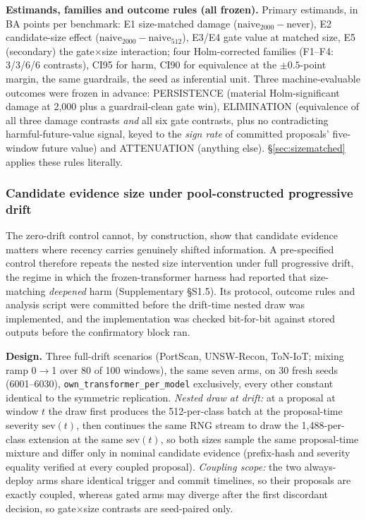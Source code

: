 \documentclass[a4paper,fleqn]{cas-sc}
\begin{document}
\textbf{Estimands, families and outcome rules (all frozen).} Primary estimands, in BA points per benchmark: E1 size-matched damage ($\mathrm{naive}_{2000}-\mathrm{never}$), E2 candidate-size effect ($\mathrm{naive}_{2000}-\mathrm{naive}_{512}$), E3/E4 gate value at matched size, E5 (secondary) the gate$\times$size interaction; four Holm-corrected families (F1--F4: 3/3/6/6 contrasts), CI95 for harm, CI90 for equivalence at the $\pm0.5$-point margin, the same guardrails, the seed as inferential unit. Three machine-evaluable outcomes were frozen in advance: PERSISTENCE (material Holm-significant damage at 2{,}000 plus a guardrail-clean gate win), ELIMINATION (equivalence of all three damage contrasts \emph{and} all six gate contrasts, plus no contradicting harmful-future-value signal, keyed to the \emph{sign rate} of committed proposals' five-window future value) and ATTENUATION (anything else). \S\ref{sec:sizematched} applies these rules literally.

\subsubsection{Candidate evidence size under pool-constructed progressive drift}
\label{sec:sizematched_drift_method}

The zero-drift control cannot, by construction, show that candidate evidence matters where recency carries genuinely shifted information. A pre-specified control therefore repeats the nested size intervention under full progressive drift, the regime in which the frozen-transformer harness had reported that size-matching \emph{deepened} harm (Supplementary \S S1.5). Its protocol, outcome rules and analysis script were committed before the drift-time nested draw was implemented, and the implementation was checked bit-for-bit against stored outputs before the confirmatory block ran.

\textbf{Design.} Three full-drift scenarios (PortScan, UNSW-Recon, ToN-IoT; mixing ramp 0$\to$1 over 80 of 100 windows), the same seven arms, on 30 fresh seeds (6001--6030), \texttt{own\_transformer\_per\_model} exclusively, every other constant identical to the symmetric replication. \emph{Nested draw at drift:} at a proposal at window $t$ the draw first produces the 512-per-class batch at the proposal-time severity $\mathrm{sev}(t)$, then continues the same RNG stream to draw the 1{,}488-per-class extension at the same $\mathrm{sev}(t)$, so both sizes sample the same proposal-time mixture and differ only in nominal candidate evidence (prefix-hash and severity equality verified at every coupled proposal). \emph{Coupling scope:} the two always-deploy arms share identical trigger and commit timelines, so their proposals are exactly coupled, whereas gated arms may diverge after the first discordant decision, so gate$\times$size contrasts are seed-paired only.
\end{document}
